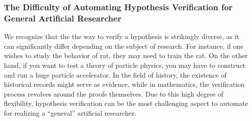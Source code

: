 \documentclass{book}
\begin{document}
\subsubsection{The Difficulty of Automating Hypothesis Verification for General Artificial Researcher}
We recognize that the the way to verify a hypothesis is strikingly diverse, as it can significantly differ depending on the subject of research. For instance, if one wishes to study the behavior of rat, they may need to train the rat. On the other hand, if you want to test a theory of particle physics, you may have to construct and run a huge particle accelerator. In the field of history, the existence of historical records might serve as evidence, while in mathematics, the verification process revolves around the proofs themselves. Due to this high degree of flexibility, hypothesis verification can be the most challenging aspect to automate for realizing a ``general'' artificial researcher.

\end{document}
